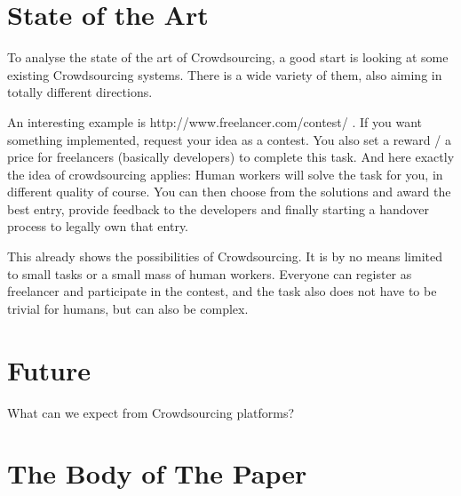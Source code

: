 \documentclass{sig-alternate}
\begin{document}
\section{State of the Art}

To analyse the state of the art of Crowdsourcing, a good start is looking at some existing Crowdsourcing systems.
There is a wide variety of them, also aiming in totally different directions.

An interesting example is http://www.freelancer.com/contest/ .
If you want something implemented, request your idea as a contest. You also set a reward / a price for freelancers (basically developers) to complete this task.
And here exactly the idea of crowdsourcing applies: Human workers will solve the task for you, in different quality of course. You can then choose
from the solutions and award the best entry, provide feedback to the developers and finally starting a handover process to legally own that entry.

This already shows the possibilities of Crowdsourcing. It is by no means limited to small tasks or a small mass of human workers.
Everyone can register as freelancer and participate in the contest, and the task also does not have to be trivial for humans, but can also be complex.

\section{Future}

What can we expect from Crowdsourcing platforms?

\section{The {\secit Body} of The Paper}

%

\end{document}
